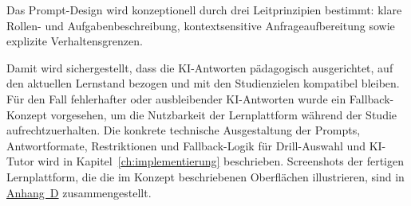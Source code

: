 Das Prompt-Design wird konzeptionell durch drei Leitprinzipien bestimmt: klare Rollen- und Aufgabenbeschreibung, kontextsensitive Anfrageaufbereitung sowie explizite Verhaltensgrenzen.

Damit wird sichergestellt, dass die KI-Antworten pädagogisch ausgerichtet, auf den aktuellen Lernstand bezogen und mit den Studienzielen kompatibel bleiben.
Für den Fall fehlerhafter oder ausbleibender KI-Antworten wurde ein Fallback-Konzept vorgesehen, um die Nutzbarkeit der Lernplattform während der Studie aufrechtzuerhalten.
Die konkrete technische Ausgestaltung der Prompts, Antwortformate, Restriktionen und Fallback-Logik für Drill-Auswahl und KI-Tutor wird in Kapitel~\ref{ch:implementierung} beschrieben.
Screenshots der fertigen Lernplattform, die die im Konzept beschriebenen Oberflächen illustrieren, sind in \hyperref[appendix:daten]{Anhang~D} zusammengestellt.


